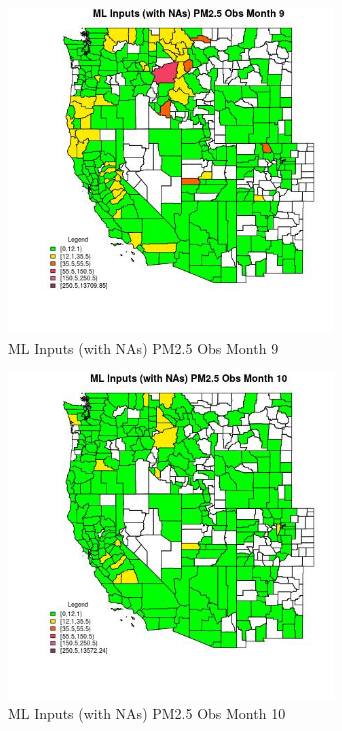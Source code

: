 \begin{figure} 
\centering  
\includegraphics[width=0.77\textwidth]{Code_Outputs/Report_ML_input_PM25_Step4_part_f_de_duplicated_aves_prioritize_24hr_obswNAs_CountyPM25_ObsmedianMonth9.jpg} 
\caption{\label{fig:Report_ML_input_PM25_Step4_part_f_de_duplicated_aves_prioritize_24hr_obswNAsCountyPM25_ObsmedianMonth9}ML Inputs (with NAs) PM2.5 Obs Month 9} 
\end{figure} 
 

\begin{figure} 
\centering  
\includegraphics[width=0.77\textwidth]{Code_Outputs/Report_ML_input_PM25_Step4_part_f_de_duplicated_aves_prioritize_24hr_obswNAs_CountyPM25_ObsmedianMonth10.jpg} 
\caption{\label{fig:Report_ML_input_PM25_Step4_part_f_de_duplicated_aves_prioritize_24hr_obswNAsCountyPM25_ObsmedianMonth10}ML Inputs (with NAs) PM2.5 Obs Month 10} 
\end{figure} 
 

